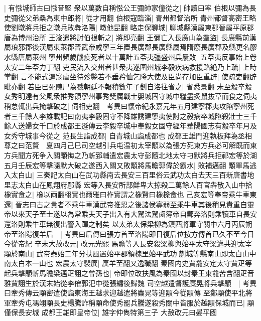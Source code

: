 |{
	有惤城師古曰惤音堅}
衆以萬數自稱惤公王彌帥家僮從之|{
	帥讀曰率}
伯根以彌為長史彌從父弟桑為東中郎將|{
	從才用翻}
伯根寇臨淄|{
	青州都督治所}
青州都督高密王略使劉暾將兵拒之暾兵敗犇洛陽|{
	暾他昆翻}
略走保聊城|{
	聊城縣漢屬東郡晉屬平原郡唐為博州治所}
王浚遣將討伯根斬之|{
	將即亮翻}
王彌亡入長廣山為羣盜|{
	長廣縣前漢屬琅邪郡後漢屬東萊郡晉武帝咸寧三年置長廣郡長廣縣屬焉隋廢長廣郡及縣更名膠水縣唐屬萊州}
寧州頻歲饑疫死者以十萬計五苓夷彊盛州兵屢敗|{
	五苓夷反事始上卷太安二年苓力丁翻}
吏民流入交州者甚衆夷遂圍州城李毅疾病救援路絶乃上疏|{
	上時掌翻}
言不能式遏寇虐坐待殄斃若不垂矜恤乞降大使及臣尚存加臣重辟|{
	使疏吏翻辟毗亦翻}
若臣已死陳尸為戮朝廷不報積數年子釗自洛往省之|{
	省悉景翻}
未至毅卒毅女秀明達有父風衆推秀領寧州事秀奬厲戰士嬰城固守城中糧盡炙鼠抜草而食之伺夷稍怠輒出兵掩擊破之|{
	伺相吏翻　考異曰懷帝紀永嘉元年五月建寧郡夷攻陷寧州死者三千餘人李雄載記曰南夷李毅固守不降雄誘建寧夷使討之毅病卒城陷殺壯士三千餘人送婦女千口於成都王遜傳云李毅卒城中奉毅女固守經年華陽國志有毅卒年月及女秀守城事今從之}
范長生詣成都|{
	自青城山詣成都也}
成都王雄門迎執板拜為丞相尊之曰范賢　夏四月己巳司空越引兵屯温初太宰顒以為張方死東方兵必可解既而東方兵聞方死争入關顒悔之乃斬郅輔遣宏農太守彭隨北地太守刁默將兵拒祁宏等於湖五月壬辰宏等擊隨默大破之遂西入關又敗顒將馬瞻郭偉於霸水|{
	敗補邁翻}
顒單馬逃入太白山|{
	三秦記太白山在武功縣南去長安三百里俗云武功太白去天三百新唐書地里志太白山在鳳翔府郿縣}
宏等入長安所部鮮卑大掠殺二萬餘人百官犇散入山中拾橡實食之|{
	橡以兩翻栩實也爾雅曰柞實謂之橡賢曰橡櫟食也}
己亥宏等奉帝乘牛車東還|{
	晉志曰古之貴者不乘牛車漢武帝推恩之後諸侯寡弱至乘牛車其後稍見貴重自靈帝以來天子至士遂以為常乘夫天子出入有大駕法駕鹵簿帝自鄴奔洛則乘犢車自長安還洛則乘牛車無復出警入蹕之制矣}
以太弟太保梁柳為鎮西將軍守關中六月丙辰朔帝至洛陽復羊后　|{
	考異曰后傳曰張方首至洛陽即日復后位按方傳首已久不至今日今從帝紀}
辛未大赦改元|{
	改元光熙}
馬瞻等入長安殺梁柳與始平太守梁邁共迎太宰顒於南山|{
	武帝泰始二年分扶風置始平郡領槐里始平武功蒯城等縣南山即太白山中南太白本一山也}
宏農太守裴廙|{
	廙羊至翻又逸職翻}
秦國内史賈龕安定太守賈疋等起兵擊顒斬馬瞻梁邁疋詡之曾孫也|{
	帝即位改扶風為秦國以封秦王東龕苦含翻疋音雅賈詡生於漢末始從李傕郭汜中從張繡後歸魏}
司空越遣督護糜晃將兵擊顒　|{
	考異曰牽秀傳云顒密遣使詣東海王越求迎越遣將麋晃等迎顒今從顒傳}
至鄭顒使平北將軍牽秀屯馮翊顒長史楊騰詐稱顒命使秀罷兵騰遂殺秀關中皆服於越顒保城而已|{
	顒僅保長安城}
成都王雄即皇帝位|{
	雄字仲雋特第三子}
大赦改元曰晏平國

